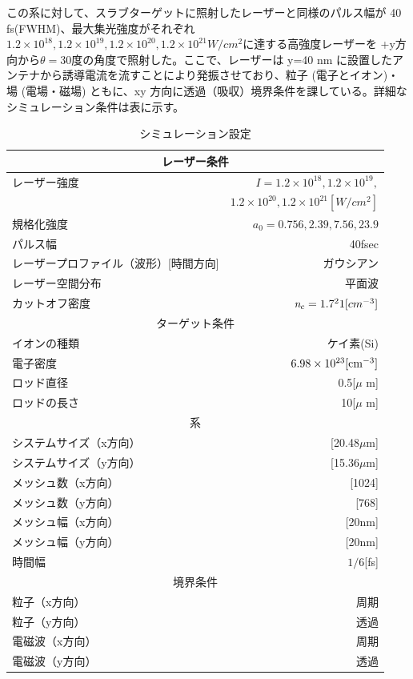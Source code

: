 \documentclass[a4paper,11pt,titlepage]{jarticle}
\numberwithin{equation}{section} %
\begin{document}
この系に対して、スラブターゲットに照射したレーザーと同様のパルス幅が 40 fs(FWHM)、最大集光強度がそれぞれ$1.2×10^{18}, 1.2×10^{19}, 1.2×10^{20}, 1.2×10^{21}W/cm^2$に達する高強度レーザーを +y方向から$\theta=$30度の角度で照射した。ここで、レーザーは y=40 nm に設置したアンテナから誘導電流を流すことにより発振させており、粒子 (電子とイオン)・場 (電場・磁場) ともに、xy 方向に透過（吸収）境界条件を課している。詳細なシミュレーション条件は表に示す。

\begin{table}[H]
  \begin{center}
    \caption{シミュレーション設定}
  \begin{tabular}{|l|r|} \hline
    \multicolumn{2}{|c|}{レーザー条件} \\ \hline
    レーザー強度 & $\textit{I}=1.2\times  10^{18},1.2\times  10^{19},$ \\ 
    　& $1.2\times  10^{20},1.2\times  10^{21}[W/cm^2]$ \\ 
    規格化強度 & $\textit{a} _0 = 0.756, 2.39, 7.56, 23.9$ \\
    パルス幅 & 40fsec \\ 
    レーザープロファイル（波形）[時間方向] & ガウシアン \\
    レーザー空間分布 & 平面波 \\
    カットオフ密度 & $\textit{n} _c = 1.7 \time 10^21 [cm^{-3}]$ \\\hline
    \multicolumn{2}{|c|}{ターゲット条件} \\ \hline
    イオンの種類 & ケイ素(Si) \\
    電子密度 &$6.98 \times  10 ^{23} [\rm{cm}^{-3}]$ \\
    ロッド直径 & 0.5[$\mu$ m] \\
    ロッドの長さ & 10[$\mu$ m]  \\ \hline
    \multicolumn{2}{|c|}{系} \\ \hline
    システムサイズ（x方向） & [20.48$\mu $m] \\
    システムサイズ（y方向） & [15.36$\mu $m] \\
    メッシュ数（x方向） & [1024] \\
    メッシュ数（y方向） & [768] \\
    メッシュ幅（x方向） & [20nm] \\
    メッシュ幅（y方向） & [20nm] \\
    時間幅 & $1/6$[fs] \\ \hline
    \multicolumn{2}{|c|}{境界条件} \\ \hline
    粒子（x方向） & 周期 \\
    粒子（y方向） & 透過 \\
    電磁波（x方向） & 周期 \\
    電磁波（y方向） & 透過 \\ \hline
  \end{tabular}
  \end{center}
  \end{table}
\end{document}
